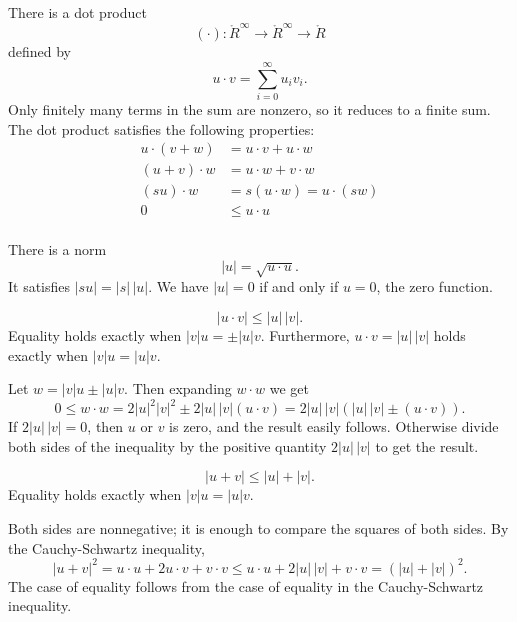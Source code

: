 
There is a dot product
$$(\cdot):\ring{R}^\infty\to\ring{R}^\infty\to\ring{R}$$ defined by
    $$u\cdot v = \sum_{i=0}^\infty u_i v_i.$$
Only finitely many terms in the sum are nonzero, so it reduces to a
finite sum.  The dot product satisfies the following
properties:
    $$\begin{array}{lll}
        u \cdot (v + w) &= u \cdot v + u \cdot w\\
        (u + v)\cdot w &= u \cdot w + v \cdot w\\
        (s u)\cdot w &= s(u \cdot w) = u \cdot (s w)\\
        0 &\le u\cdot u\\
    \end{array}$$


There is a norm
$$|u| = \sqrt{u\cdot u}.$$
It satisfies $| s u | = |s| \, |u|$.  We have $|u|=0$  if and
only if $u=0$, the zero function.

\begin{lemma}
    $$|u \cdot v| \le |u|\,|v|.$$
Equality holds exactly when $|v|u = \pm |u|v$.  Furthermore,
$u\cdot v = |u|\,|v|$ holds exactly when $|v| u = |u| v$.
\end{lemma}

\begin{proved}
   Let $w = |v| u \pm |u| v$.  Then expanding $w\cdot w$ we get
    $$0\le w\cdot w = 2|u|^2|v|^2 \pm 2|u|\, |v| (u\cdot v) =
    2|u|\,
    |v| (|u|\, |v| \pm (u \cdot v)).$$
    If $2|u| \,|v| = 0$, then $u$ or $v$ is zero, and the result
    easily follows.  Otherwise divide both sides of the inequality
    by the positive quantity $2 |u| \,|v|$ to get the result.
\swallowed\end{proved}

\begin{lemma}
  $$
  |u + v| \le |u| + |v |.
  $$
Equality holds exactly when $|v|u = |u|v$.
\end{lemma}

\begin{proved}
Both sides are nonnegative; it is enough to compare the squares of
both sides.  By the Cauchy-Schwartz inequality,
    $$|u + v|^2 = u\cdot u + 2 u\cdot v + v\cdot v \le
      u\cdot u + 2 | u|\,|v| + v\cdot v = (|u|+|v|)^2.
    $$
The case of equality follows from the case of equality in the
Cauchy-Schwartz inequality.
\swallowed\end{proved}

